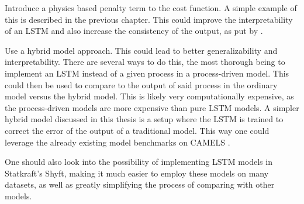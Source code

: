 Introduce a physics based penalty term to the cost function. A simple example of 
this is described in the previous chapter. This could improve the interpretability 
of an LSTM and also increase the consistency of the output, as put by \citet{hybrid_paper}.

Use a hybrid model approach. This could lead to better generalizability and 
interpretability. There are several ways to do this, the most thorough being to 
implement an LSTM instead of a given process in a process-driven model. This could 
then be used to compare to the output of said process in the ordinary model versus 
the hybrid model. This is likely very computationally expensive, as the process-driven 
models are more expensive than pure LSTM models. A simpler hybrid model discussed 
in this thesis is a setup where the LSTM is trained to correct the error of 
the output of a traditional model. This way one could leverage the already existing 
model benchmarks on CAMELS \citep{CAMELS_hydroshare}.

One should also look into the possibility of implementing LSTM models in Statkraft's 
Shyft\citep{Shyft}, making it much easier to employ these models on many datasets, 
as well as greatly simplifying the process of comparing with other models.
